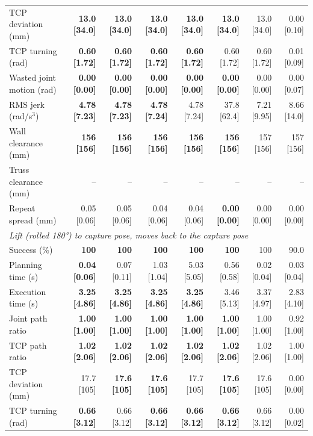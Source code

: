 \begin{table}[t]
\begin{tabular}{lrrrrrrr}
TCP deviation (mm) & \textbf{13.0 [34.0]} & \textbf{13.0 [34.0]} & \textbf{13.0 [34.0]} & \textbf{13.0 [34.0]} & \textbf{13.0 [34.0]} & 13.0 [34.0] & 0.00 [0.10] \\
TCP turning (rad) & \textbf{0.60 [1.72]} & \textbf{0.60 [1.72]} & \textbf{0.60 [1.72]} & \textbf{0.60 [1.72]} & 0.60 [1.72] & 0.60 [1.72] & 0.01 [0.09] \\
Wasted joint motion (rad) & \textbf{0.00 [0.00]} & \textbf{0.00 [0.00]} & \textbf{0.00 [0.00]} & \textbf{0.00 [0.00]} & \textbf{0.00 [0.00]} & 0.00 [0.00] & 0.00 [0.07] \\
RMS jerk (rad/s$^3$) & \textbf{4.78 [7.23]} & \textbf{4.78 [7.23]} & \textbf{4.78 [7.24]} & 4.78 [7.24] & 37.8 [62.4] & 7.21 [9.95] & 8.66 [14.0] \\
Wall clearance (mm) & \textbf{156 [156]} & \textbf{156 [156]} & \textbf{156 [156]} & \textbf{156 [156]} & \textbf{156 [156]} & 157 [156] & 157 [156] \\
Truss clearance (mm) & -- & -- & -- & -- & -- & -- & -- \\
Repeat spread (mm) & 0.05 [0.06] & 0.05 [0.06] & 0.04 [0.06] & 0.04 [0.06] & \textbf{0.00 [0.00]} & 0.00 [0.00] & 0.00 [0.00] \\
\midrule
\multicolumn{8}{l}{\emph{Lift (rolled 180°) to capture pose, moves back to the capture pose}} \\
Success (\%) & \textbf{100} & \textbf{100} & \textbf{100} & \textbf{100} & \textbf{100} & 100 & 90.0 \\
Planning time (s) & \textbf{0.04 [0.06]} & 0.07 [0.11] & 1.03 [1.04] & 5.03 [5.05] & 0.56 [0.58] & 0.02 [0.04] & 0.03 [0.04] \\
Execution time (s) & \textbf{3.25 [4.86]} & \textbf{3.25 [4.86]} & \textbf{3.25 [4.86]} & \textbf{3.25 [4.86]} & 3.46 [5.13] & 3.37 [4.97] & 2.83 [4.10] \\
Joint path ratio & \textbf{1.00 [1.00]} & \textbf{1.00 [1.00]} & \textbf{1.00 [1.00]} & \textbf{1.00 [1.00]} & \textbf{1.00 [1.00]} & 1.00 [1.00] & 0.92 [1.00] \\
TCP path ratio & \textbf{1.02 [2.06]} & \textbf{1.02 [2.06]} & \textbf{1.02 [2.06]} & \textbf{1.02 [2.06]} & \textbf{1.02 [2.06]} & 1.02 [2.06] & 1.00 [1.00] \\
TCP deviation (mm) & 17.7 [105] & \textbf{17.6 [105]} & \textbf{17.6 [105]} & 17.7 [105] & \textbf{17.6 [105]} & 17.6 [105] & 0.00 [0.00] \\
TCP turning (rad) & \textbf{0.66 [3.12]} & 0.66 [3.12] & \textbf{0.66 [3.12]} & \textbf{0.66 [3.12]} & \textbf{0.66 [3.12]} & 0.66 [3.12] & 0.00 [0.02] \\

\end{tabular}
\end{table}
